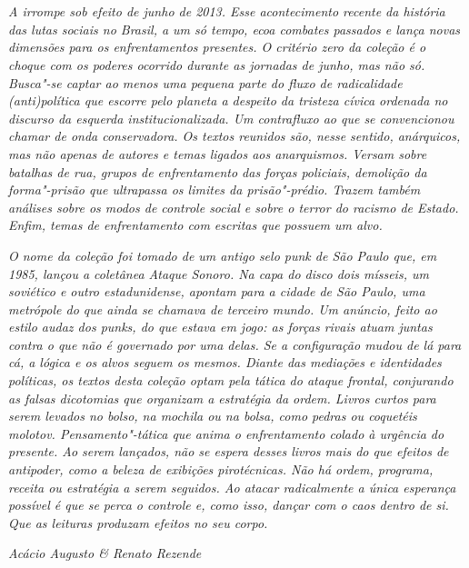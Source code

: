 



\chapter*{}
\thispagestyle{empty}

\vspace*{\fill}

\begin{flushright}
\begin{adjustwidth}{2.0cm}{}
\raggedleft\scriptsize\emph{A  irrompe sob efeito de junho de 2013.
Esse acontecimento recente da história das lutas sociais no Brasil, a um só
tempo, ecoa combates passados e lança novas dimensões para os
enfrentamentos presentes. O critério zero da coleção é o choque com os
poderes ocorrido durante as \emph{jornadas de
junho}, mas não só. Busca"-se captar ao menos uma pequena parte do fluxo de
radicalidade (anti)política que escorre pelo planeta a despeito da
tristeza cívica ordenada no discurso da esquerda institucionalizada. Um
contrafluxo ao que se convencionou chamar de onda conservadora. Os
textos reunidos são, nesse sentido,
anárquicos, mas não apenas de autores e temas ligados aos
anarquismos. Versam sobre batalhas de
rua, grupos de enfrentamento das forças policiais, demolição da forma"-prisão que
ultrapassa os limites da prisão"-prédio. Trazem também análises sobre os
modos de controle social e sobre o terror do racismo de Estado. Enfim, temas de enfrentamento com
escritas que possuem um alvo.}

\emph{O nome da coleção foi tomado de um antigo
selo punk de São Paulo que, em 1985, lançou a coletânea \emph{Ataque
Sonoro}. Na capa do disco dois mísseis, um soviético e outro
estadunidense, apontam para a cidade de São Paulo, uma metrópole do que
ainda se chamava de terceiro mundo. Um anúncio, feito ao estilo audaz
dos punks, do que estava em jogo: as forças rivais atuam juntas contra o
que não é governado por uma delas. Se a configuração mudou de lá para
cá, a lógica e os alvos seguem os mesmos. Diante das mediações e
identidades políticas, os textos desta coleção optam pela tática do
ataque frontal, conjurando as falsas dicotomias que organizam a
estratégia da ordem. Livros curtos para serem levados no bolso, na
mochila ou na bolsa, como pedras ou coquetéis molotov.
Pensamento"-tática que anima o enfrentamento colado à urgência do
presente. Ao serem lançados, não se espera desses livros mais do que
efeitos de antipoder, como a beleza de exibições pirotécnicas. Não há
ordem, programa, receita ou estratégia a serem seguidos. Ao atacar
radicalmente a única esperança possível é que se perca o controle e,
como isso, dançar com o caos dentro de si. Que as leituras produzam
efeitos no seu corpo.}

\medskip

\emph{Acácio Augusto \& Renato Rezende}
\end{adjustwidth}
\end{flushright}


